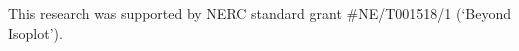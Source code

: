 \documentclass[gchron, manuscript]{copernicus}
\begin{document}

\begin{acknowledgements}
This research was supported by NERC standard grant #NE/T001518/1
(`Beyond Isoplot').
\end{acknowledgements}



















\end{document}
